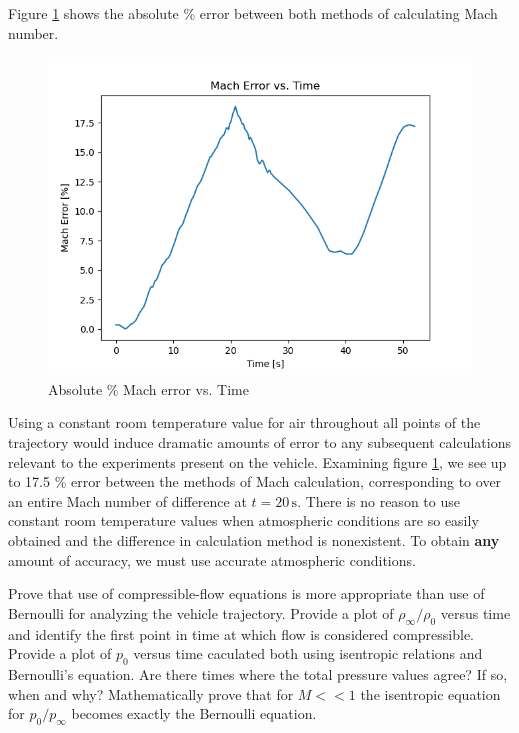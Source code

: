 \documentclass[../main.tex]{subfiles}
\begin{document}
Figure \ref{Mach_error} shows the absolute \% error between both methods of calculating Mach number.

\begin{figure}[h]
    \centering
    \includegraphics[scale=.7]{../../images/problem_1/Mach_Error_vs_Time.png}
    \caption{Absolute \% Mach error vs. Time}
    \label{Mach_error}
\end{figure}

\discussion{}

Using a constant room temperature value for air throughout all points of the trajectory would induce dramatic amounts of error to any subsequent calculations relevant to the experiments present on the vehicle.
Examining figure \ref{Mach_error}, we see up to 17.5 \% error between the methods of Mach calculation, corresponding to over an entire Mach number of difference at \(t=20\,\unit{\s}\).
There is no reason to use constant room temperature values when atmospheric conditions are so easily obtained and the difference in calculation method is nonexistent. 
To obtain \textbf{any} amount of accuracy, we must use accurate atmospheric conditions.

\clearpage


Prove that use of compressible-flow equations is more appropriate than use of Bernoulli for analyzing the vehicle trajectory.
Provide a plot of \(\rho_\infty/\rho_0\) versus time and identify the first point in time at which flow is considered compressible.
Provide a plot of \(p_0\) versus time caculated both using isentropic relations and Bernoulli's equation.
Are there times where the total pressure values agree?
If so, when and why?
Mathematically prove that for \(M<<1\) the isentropic equation for \(p_0/p_\infty\) becomes exactly the Bernoulli equation.
\end{document}
